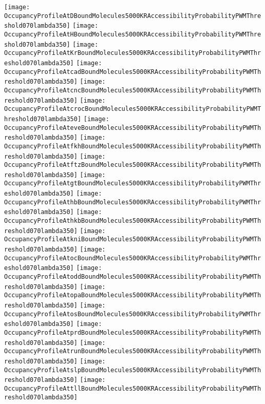 \documentclass[11pt]{article}
\begin{document}
 


\begin{center}
\texttt{[image: OccupancyProfileAtDBoundMolecules5000KRAccessibilityProbabilityPWMThreshold070lambda350]}
\texttt{[image: OccupancyProfileAtHBoundMolecules5000KRAccessibilityProbabilityPWMThreshold070lambda350]}
\texttt{[image: OccupancyProfileAtKrBoundMolecules5000KRAccessibilityProbabilityPWMThreshold070lambda350]}
\texttt{[image: OccupancyProfileAtcadBoundMolecules5000KRAccessibilityProbabilityPWMThreshold070lambda350]}
\texttt{[image: OccupancyProfileAtcncBoundMolecules5000KRAccessibilityProbabilityPWMThreshold070lambda350]}
\texttt{[image: OccupancyProfileAtcrocBoundMolecules5000KRAccessibilityProbabilityPWMThreshold070lambda350]}
\texttt{[image: OccupancyProfileAteveBoundMolecules5000KRAccessibilityProbabilityPWMThreshold070lambda350]}
\texttt{[image: OccupancyProfileAtfkhBoundMolecules5000KRAccessibilityProbabilityPWMThreshold070lambda350]}
\texttt{[image: OccupancyProfileAtftzBoundMolecules5000KRAccessibilityProbabilityPWMThreshold070lambda350]}
\texttt{[image: OccupancyProfileAtgtBoundMolecules5000KRAccessibilityProbabilityPWMThreshold070lambda350]}
\texttt{[image: OccupancyProfileAthbBoundMolecules5000KRAccessibilityProbabilityPWMThreshold070lambda350]}
\texttt{[image: OccupancyProfileAthkbBoundMolecules5000KRAccessibilityProbabilityPWMThreshold070lambda350]}
\texttt{[image: OccupancyProfileAtkniBoundMolecules5000KRAccessibilityProbabilityPWMThreshold070lambda350]}
\texttt{[image: OccupancyProfileAtocBoundMolecules5000KRAccessibilityProbabilityPWMThreshold070lambda350]}
\texttt{[image: OccupancyProfileAtoddBoundMolecules5000KRAccessibilityProbabilityPWMThreshold070lambda350]}
\texttt{[image: OccupancyProfileAtopaBoundMolecules5000KRAccessibilityProbabilityPWMThreshold070lambda350]}
\texttt{[image: OccupancyProfileAtosBoundMolecules5000KRAccessibilityProbabilityPWMThreshold070lambda350]}
\texttt{[image: OccupancyProfileAtprdBoundMolecules5000KRAccessibilityProbabilityPWMThreshold070lambda350]}
\texttt{[image: OccupancyProfileAtrunBoundMolecules5000KRAccessibilityProbabilityPWMThreshold070lambda350]}
\texttt{[image: OccupancyProfileAtslpBoundMolecules5000KRAccessibilityProbabilityPWMThreshold070lambda350]}
\texttt{[image: OccupancyProfileAttllBoundMolecules5000KRAccessibilityProbabilityPWMThreshold070lambda350]}
\end{center}


\end{document}
